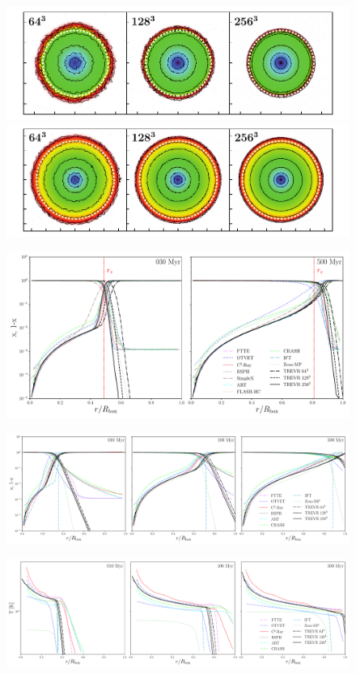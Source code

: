 \documentclass[fleq,usenatbib]{mnras}
\begin{document}
\begin{figure}
\includegraphics[width=1\linewidth]{Figures/strom_slice_iso_030.pdf}
\includegraphics[width=1\linewidth]{Figures/strom_slice_iso_500.pdf}
\caption{}
\label{fig:stromslice}
\end{figure}

\newpage
\begin{figure}
\includegraphics[width=0.95\linewidth]{Figures/strom_iso_fraction.pdf}
\caption{}
\label{fig:stromiso}
\end{figure}
\begin{figure}
\includegraphics[width=0.95\linewidth]{Figures/strom_fraction.pdf}
\caption{}
\label{fig:stromtherm}
\end{figure}
\begin{figure}
\includegraphics[width=0.95\linewidth]{Figures/strom_temp.pdf}
\caption{}
\label{fig:stromtemp}
\end{figure}
\end{document}
